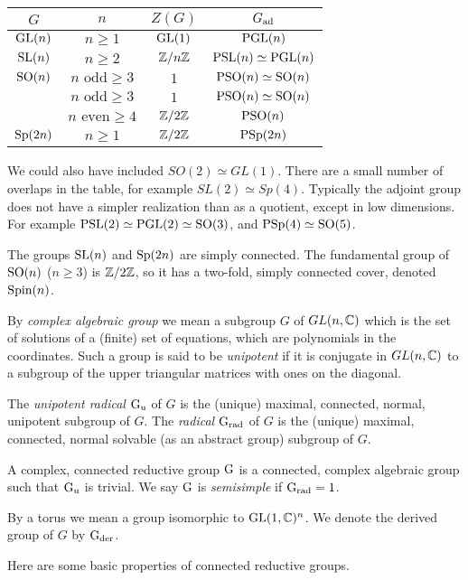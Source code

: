 \begin{tabular}{|c|c|c|c|}
\hline
$G$& $n$ & $Z(G)$ & $G_{\text{ad}}$\\\hline
$\text{GL}(n)$ & $n\ge 1$ &$\text{GL}(1)$ & $\text{PGL}(n)$ \\\hline
$\text{SL}(n)$ & $n\ge 2$& $\mathbb Z/n\mathbb Z$ & $\text{PSL}(n)\simeq \text{PGL}(n)$ \\\hline
$\text{SO}(n)$ & $n\text{ odd}\ge 3$ &$1$ & $\text{PSO}(n)\simeq \text{SO}(n)$\\\hline
 & $n\text{ odd}\ge 3$ &$1$ & $\text{PSO}(n)\simeq \text{SO}(n)$\\\hline
& $n\text{ even}\ge 4$& $\mathbb Z/2\mathbb Z$ & $\text{PSO}(n)$\\\hline
$\text{Sp}(2n)$ & $n\ge 1$ & $\mathbb Z/2\mathbb Z$ & $\text{PSp}(2n)$\\\hline
\end{tabular}
\bigskip

We could also have included $SO(2)\simeq GL(1)$.
There are a small number of overlaps in the table, for example $SL(2)\simeq Sp(4)$. 
Typically the adjoint
group does not have a simpler realization than as a quotient, except in low dimensions. 
For example 
$\text{PSL}(2)\simeq \text{PGL}(2)\simeq \text{SO}(3)$, and $\text{PSp}(4)\simeq \text{SO}(5)$. 

The groups $\text{SL}(n)$ and $\text{Sp}(2n)$ are simply connected. The fundamental
group of $\text{SO}(n)$ ($n\ge 3$) is $\mathbb Z/2\mathbb Z$, so it has a two-fold, simply connected cover, denoted $\text{Spin}(n)$. 

By {\it complex algebraic group} we mean a subgroup $G$ of $GL(n,\mathbb C)$
which is the set of solutions of a (finite) set of equations, which
are polynomials in the coordinates. Such a group is said to be {\it
  unipotent} if it is conjugate in $GL(n,\mathbb C)$ to a subgroup of
the upper triangular matrices with ones on the diagonal.

The {\it unipotent radical} $\text{G}_{\text{u}}$ of $G$ is the (unique) maximal,
connected, normal, unipotent subgroup of $G$.  The {\it radical}
$\text{G}_{\text{rad}}$ of $G$ is the (unique) maximal, connected, normal solvable (as
an abstract group) subgroup of $G$. 

\begin{definition}
A complex, connected reductive group $\text{G}$ is a connected, complex algebraic group such that $\text{G}_{\text{u}}$ is trivial. 
We say $\text{G}$ is {\it semisimple} if  $\text{G}_{\text{rad}}=1$.
\end{definition}

By a torus we mean a group isomorphic to $\text{GL}(1,\mathbb C)^n$. We denote the derived group of $G$ by $\text{G}_{\text{der}}$. 

Here are some basic properties of connected reductive groups. 


